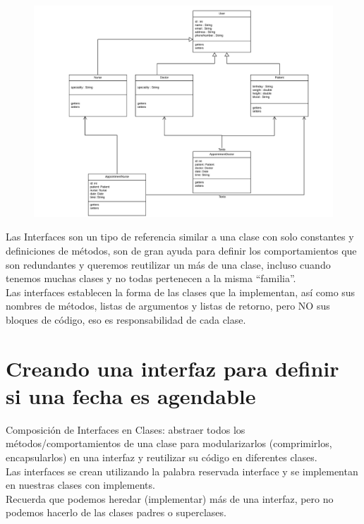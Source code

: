 \documentclass{article}
\begin{document}
\begin{figure}[h!]
  \centering
  \includegraphics[scale=0.5]{./Pictures/046_diagrama.png}
\end{figure}

Las Interfaces son un tipo de referencia similar a una clase con solo
constantes y definiciones de métodos, son de gran ayuda para definir los
comportamientos que son redundantes y queremos reutilizar un más de una clase,
incluso cuando tenemos muchas clases y no todas pertenecen a la misma
“familia”.\\

Las interfaces establecen la forma de las clases que la implementan, así como
sus nombres de métodos, listas de argumentos y listas de retorno, pero NO sus
bloques de código, eso es responsabilidad de cada clase.\\


\section{Creando una interfaz para definir si una fecha es agendable}%
Composición de Interfaces en Clases: abstraer todos los métodos/comportamientos
de una clase para modularizarlos (comprimirlos, encapsularlos) en una interfaz
y reutilizar su código en diferentes clases.\\

Las interfaces se crean utilizando la palabra reservada interface y se
implementan en nuestras clases con implements.\\

Recuerda que podemos heredar (implementar) más de una interfaz, pero no podemos
hacerlo de las clases padres o superclases.\\
\end{document}
